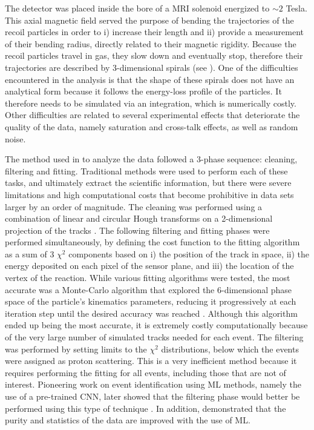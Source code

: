 \documentclass[review,number,sort&compress]{elsarticle}
\begin{document}
The detector was placed inside the bore of a MRI solenoid energized to $\sim 2$ Tesla. This axial magnetic field served the purpose of bending the trajectories of the recoil particles in order to i) increase their length and ii) provide a measurement of their bending radius, directly related to their magnetic rigidity. Because the recoil particles travel in gas, they slow down and eventually stop, therefore their trajectories are described by 3-dimensional spirals (see \cite{Bradt2017}). One of the difficulties encountered in the analysis is that the shape of these spirals does not have an analytical form because it follows the energy-loss profile of the particles. It therefore needs to be simulated via an integration, which is numerically costly. Other difficulties are related to several experimental effects that deteriorate the quality of the data, namely saturation and cross-talk effects, as well as random noise. 

The method used in \cite{Bradt2018} to analyze the data followed a 3-phase sequence: cleaning, filtering and fitting. Traditional methods were used to perform each of these tasks, and ultimately extract the scientific information, but there were severe limitations and high computational costs that become prohibitive in data sets larger by an order of magnitude. 
The cleaning was performed using a combination of linear and circular Hough transforms on a 2-dimensional projection of the tracks \cite{Bradt2017}. The following filtering and fitting phases were performed simultaneously, by defining the cost function to the fitting algorithm as a sum of 3 $\chi^2$ components based on i) the position of the track in space, ii) the energy deposited on each pixel of the sensor plane, and iii) the location of the vertex of the reaction. While various fitting algorithms were tested, the most accurate was a Monte-Carlo algorithm that explored the 6-dimensional phase space of the particle's kinematics parameters, reducing it progressively at each iteration step until the desired accuracy was reached \cite{Bradt2017}. Although this algorithm ended up being the most accurate, it is extremely costly computationally because of the very large number of simulated tracks needed for each event. The filtering was performed by setting limits to the $\chi^2$ distributions, below which the events were assigned as proton scattering. This is a very inefficient method because it requires performing the fitting for all events, including those that are not of interest. Pioneering work on event identification using ML methods, namely the use of a pre-trained CNN, later showed that the filtering phase would better be performed using this type of technique \cite{Kuchera2019}. 
In addition, \cite{Kuchera2019} demonstrated that the purity and statistics of the data are improved with the use of ML.
\end{document}
